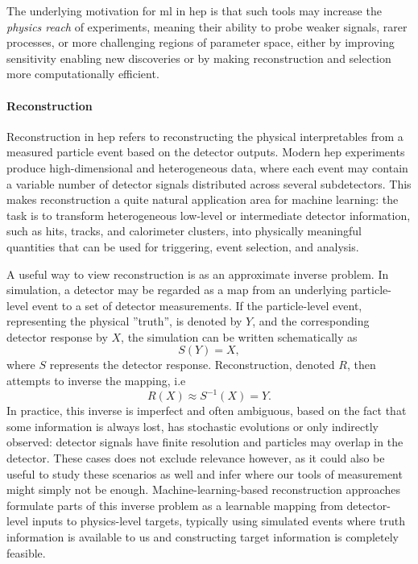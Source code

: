 The underlying motivation for \gls{ml} in \gls{hep} is that such tools may increase the \textit{physics reach} of experiments, meaning their ability to probe weaker signals, rarer processes, or more challenging regions of parameter space, either by improving sensitivity enabling new discoveries or by making reconstruction and selection more computationally efficient. 

\paragraph{Reconstruction} Reconstruction in \gls{hep} refers to reconstructing the physical interpretables from a measured particle event based on the detector outputs.  Modern \gls{hep} experiments produce high-dimensional and heterogeneous data, where each event may contain a variable number of detector signals distributed across several subdetectors. This makes reconstruction a quite natural application area for machine learning: the task is to transform heterogeneous low-level or intermediate detector information, such as hits, tracks, and calorimeter clusters, into physically meaningful quantities that can be used for triggering, event selection, and analysis.



A useful way to view reconstruction is as an approximate inverse problem. In simulation, a detector may be regarded as a map from an underlying particle-level event to a set of detector measurements. If the particle-level event, representing the physical ''truth'', is denoted by \(Y\), and the corresponding detector response by \(X\), the simulation can be written schematically as
\begin{equation}
    S(Y) = X ,
\end{equation}
where \(S\) represents the detector response. Reconstruction, denoted $R$,  then attempts to inverse the mapping, i.e
\begin{equation}
    R(X) \approx S^{-1}(X) = Y .
\end{equation}
In practice, this inverse is imperfect and often ambiguous, based on the fact that some information is always lost, has stochastic evolutions or only indirectly observed: detector signals have finite resolution and particles may overlap in the detector. These cases does not exclude relevance however, as it could also be useful to study these scenarios as well and infer where our tools of measurement might simply not be enough. Machine-learning-based reconstruction approaches formulate parts of this inverse problem as a learnable mapping from detector-level inputs to physics-level targets, typically using simulated events where truth information is available to us and constructing target information is completely feasible.

